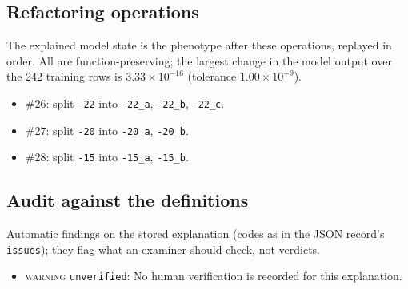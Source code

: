 \begin{drafted}
\subsection{Refactoring operations}\label{app:heart-s1-c1:operations}
The explained model state is the phenotype after these operations, replayed in order. All are function-preserving; the largest change in the model output over the 242 training rows is $3.33\times 10^{-16}$ (tolerance $1.00\times 10^{-9}$).
\begin{itemize}
\item \#26: split \texttt{-22} into \texttt{-22\_\allowbreak{}a}, \texttt{-22\_\allowbreak{}b}, \texttt{-22\_\allowbreak{}c}.
\item \#27: split \texttt{-20} into \texttt{-20\_\allowbreak{}a}, \texttt{-20\_\allowbreak{}b}.
\item \#28: split \texttt{-15} into \texttt{-15\_\allowbreak{}a}, \texttt{-15\_\allowbreak{}b}.
\end{itemize}
\subsection{Audit against the definitions}\label{app:heart-s1-c1:audit}
Automatic findings on the stored explanation (codes as in the JSON record's \texttt{issues}); they flag what an examiner should check, not verdicts.
\begin{itemize}
\item \textsc{warning} \texttt{unverified}: No human verification is recorded for this explanation.
\end{itemize}
\end{drafted}
